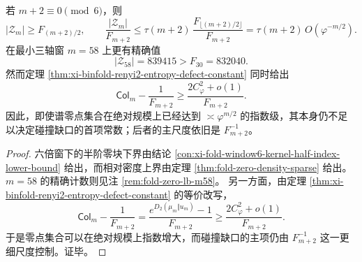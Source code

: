 \begin{corollary}[谱零点绝对规模与碰撞缺口主尺度的解耦]\label{cor:xi-binfold-zero-block-collision-gap-decoupling}
若 \(m+2\equiv 0\pmod 6\)，则
\[
|\mathcal Z_m|\ge F_{(m+2)/2},
\qquad
\frac{|\mathcal Z_m|}{F_{m+2}}
\le
\tau(m+2)\,\frac{F_{\lfloor (m+2)/2\rfloor}}{F_{m+2}}
=
\tau(m+2)\,O(\varphi^{-m/2}).
\]
在最小三轴窗 \(m=58\) 上更有精确值
\[
|\mathcal Z_{58}|=839415>F_{30}=832040.
\]
然而定理 \ref{thm:xi-binfold-renyi2-entropy-defect-constant} 同时给出
\[
\mathsf{Col}_m-\frac{1}{F_{m+2}}
\ge
\frac{2C_\varphi^2+o(1)}{F_{m+2}}.
\]
因此，即使谱零点集合在绝对规模上已经达到 \(\asymp \varphi^{m/2}\) 的指数级，其本身仍不足以决定碰撞缺口的首项常数；后者的主尺度依旧是 \(F_{m+2}^{-1}\)。
\end{corollary}
\begin{proof}
六倍窗下的半阶零块下界由结论 \ref{con:xi-fold-window6-kernel-half-index-lower-bound} 给出，而相对密度上界由定理 \ref{thm:fold-zero-density-sparse} 给出。\(m=58\) 的精确计数则见注 \ref{rem:fold-zero-lb-m58}。
另一方面，由定理 \ref{thm:xi-binfold-renyi2-entropy-defect-constant} 的等价改写，
\[
\mathsf{Col}_m-\frac{1}{F_{m+2}}
=
\frac{e^{D_2(\mu_m\Vert u_m)}-1}{F_{m+2}}
\ge
\frac{2C_\varphi^2+o(1)}{F_{m+2}}.
\]
于是零点集合可以在绝对规模上指数增大，而碰撞缺口的主项仍由 \(F_{m+2}^{-1}\) 这一更细尺度控制。证毕。
\end{proof}

